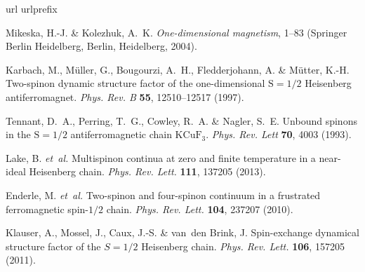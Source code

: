 \documentclass[aps,prx,showpacs,floatfix,twocolumn,superscriptaddress,nofootinbib,longbibliography]{revtex4-2}
\begin{document}
\begin{thebibliography}{10}
  \expandafter\ifx\csname url\endcsname\relax
    \def\url#1{\texttt{#1}}\fi
  \expandafter\ifx\csname urlprefix\endcsname\relax\def\urlprefix{URL }\fi
  \providecommand{\bibinfo}[2]{#2}
  \providecommand{\eprint}[2][]{\url{#2}}
  
  \bibinfo{author}{Mikeska, H.-J.} \& \bibinfo{author}{Kolezhuk, A.~K.}
  \newblock \emph{\bibinfo{title}{One-dimensional magnetism}},
    \bibinfo{pages}{1--83} (\bibinfo{publisher}{Springer Berlin Heidelberg},
    \bibinfo{address}{Berlin, Heidelberg}, \bibinfo{year}{2004}).
  
  \bibinfo{author}{Karbach, M.}, \bibinfo{author}{M\"uller, G.},
    \bibinfo{author}{Bougourzi, A.~H.}, \bibinfo{author}{Fledderjohann, A.} \&
    \bibinfo{author}{M\"utter, K.-H.}
  \newblock \bibinfo{title}{Two-spinon dynamic structure factor of the
    one-dimensional $\mathrm{S}=1/2$ {Heisenberg} antiferromagnet}.
  \newblock \emph{\bibinfo{journal}{Phys. Rev. B}} \textbf{\bibinfo{volume}{55}},
    \bibinfo{pages}{12510--12517} (\bibinfo{year}{1997}).
  
  \bibinfo{author}{Tennant, D.~A.}, \bibinfo{author}{Perring, T.~G.},
    \bibinfo{author}{Cowley, R.~A.} \& \bibinfo{author}{Nagler, S.~E.}
  \newblock \bibinfo{title}{Unbound spinons in the $\mathrm{S}=1/2$
    antiferromagnetic chain $\mathrm{KCuF}_3$}.
  \newblock \emph{\bibinfo{journal}{Phys. Rev. Lett}}
    \textbf{\bibinfo{volume}{70}}, \bibinfo{pages}{4003} (\bibinfo{year}{1993}).
  
  \bibinfo{author}{Lake, B.} \emph{et~al.}
  \newblock \bibinfo{title}{Multispinon continua at zero and finite temperature
    in a near-ideal {Heisenberg} chain}.
  \newblock \emph{\bibinfo{journal}{Phys. Rev. Lett.}}
    \textbf{\bibinfo{volume}{111}}, \bibinfo{pages}{137205}
    (\bibinfo{year}{2013}).
  
  \bibinfo{author}{Enderle, M.} \emph{et~al.}
  \newblock \bibinfo{title}{Two-spinon and four-spinon continuum in a frustrated
    ferromagnetic spin-$1/2$ chain}.
  \newblock \emph{\bibinfo{journal}{Phys. Rev. Lett.}}
    \textbf{\bibinfo{volume}{104}}, \bibinfo{pages}{237207}
    (\bibinfo{year}{2010}).
  
  \bibinfo{author}{Klauser, A.}, \bibinfo{author}{Mossel, J.},
    \bibinfo{author}{Caux, J.-S.} \& \bibinfo{author}{van~den Brink, J.}
  \newblock \bibinfo{title}{Spin-exchange dynamical structure factor of the
    {$S=1/2$} {Heisenberg} chain}.
  \newblock \emph{\bibinfo{journal}{Phys. Rev. Lett.}}
    \textbf{\bibinfo{volume}{106}}, \bibinfo{pages}{157205}
    (\bibinfo{year}{2011}).
  

\end{thebibliography}
\end{document}
